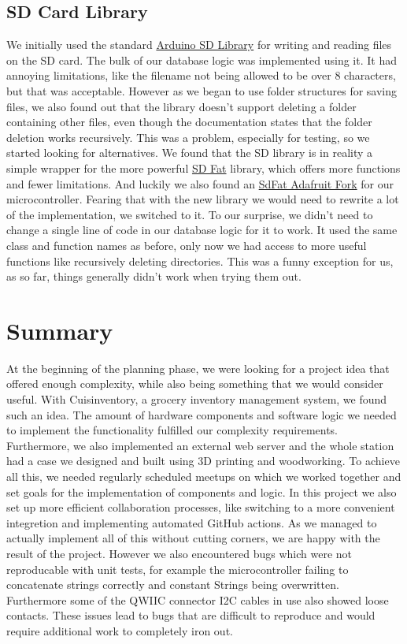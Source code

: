 \documentclass{article}
\begin{document}
\subsection{SD Card Library}
We initially used the standard \href{https://github.com/arduino-libraries/SD}{Arduino SD Library} for writing and reading files on the SD card. The bulk of our database logic was implemented using it.
It had annoying limitations, like the filename not being allowed to be over 8 characters, but that was acceptable.
However as we began to use folder structures for saving files, we also found out that the library doesn't support deleting a folder containing other files, even though the documentation states that the folder deletion works recursively.
This was a problem, especially for testing, so we started looking for alternatives. We found that the SD library is in reality a simple wrapper for the more powerful \href{https://github.com/greiman/SdFat}{SD Fat} library, which offers more functions and fewer limitations.
And luckily we also found an \href{https://github.com/adafruit/SdFat}{SdFat Adafruit Fork} for our microcontroller. Fearing that with the new library we would need to rewrite a lot of the implementation, we switched to it.
To our surprise, we didn't need to change a single line of code in our database logic for it to work. It used the same class and function names as before, only now we had access to more useful functions like recursively deleting directories.
This was a funny exception for us, as so far, things generally didn't work when trying them out.

\section{Summary}
At the beginning of the planning phase, we were looking for a project idea that offered enough complexity, while also being something that we would consider useful.
With Cuisinventory, a grocery inventory management system, we found such an idea. The amount of hardware components and software logic we needed to implement the functionality fulfilled our complexity requirements.
Furthermore, we also implemented an external web server and the whole station had a case we designed and built using 3D printing and woodworking.
To achieve all this, we needed regularly scheduled meetups on which we worked together and set goals for the implementation of components and logic.
In this project we also set up more efficient collaboration processes, like switching to a more convenient integretion  and implementing automated GitHub actions.
As we managed to actually implement all of this without cutting corners, we are happy with the result of the project.
However we also encountered bugs which were not reproducable with unit tests, for example the microcontroller failing to concatenate strings correctly and constant Strings being overwritten.
Furthermore some of the QWIIC connector I2C cables in use also showed loose contacts.
These issues lead to bugs that are difficult to reproduce and would require additional work to completely iron out.
\end{document}
